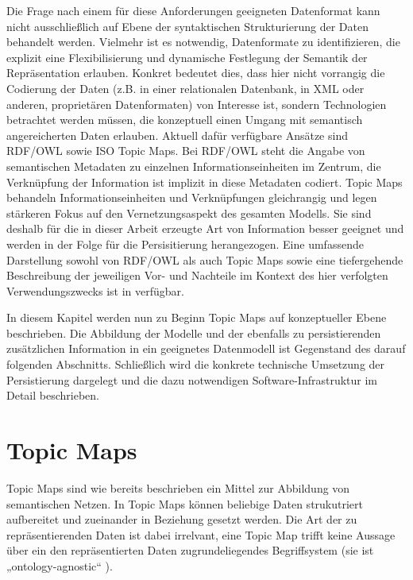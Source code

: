 Die Frage nach einem für diese Anforderungen geeigneten Datenformat kann nicht ausschließlich auf Ebene der syntaktischen Strukturierung der Daten behandelt werden. Vielmehr ist es notwendig, Datenformate zu identifizieren, die explizit eine Flexibilisierung und dynamische Festlegung der Semantik der Repräsentation erlauben. Konkret bedeutet dies, dass hier nicht vorrangig die Codierung der Daten (z.B. in einer relationalen Datenbank, in \gls{XML} oder anderen, proprietären Datenformaten) von Interesse ist, sondern Technologien betrachtet werden müssen, die konzeptuell einen Umgang mit semantisch angereicherten Daten erlauben. Aktuell dafür verfügbare Ansätze sind \gls{RDF}/\gls{OWL} sowie ISO Topic Maps. Bei \gls{RDF}/\gls{OWL} steht die Angabe von semantischen Metadaten zu einzelnen Informationseinheiten im Zentrum, die Verknüpfung der Information ist implizit in diese Metadaten codiert. Topic Maps behandeln Informationseinheiten und Verknüpfungen gleichrangig und legen stärkeren Fokus auf den Vernetzungsaspekt des gesamten Modells. Sie sind deshalb für die in dieser Arbeit erzeugte Art von Information besser geeignet und werden in der Folge für die Persisitierung herangezogen. Eine umfassende Darstellung sowohl von \gls{RDF}/\gls{OWL} als auch Topic Maps sowie eine tiefergehende Beschreibung der jeweiligen Vor- und Nachteile im Kontext des hier verfolgten Verwendungszwecks ist in \citep{Oppl07} verfügbar.

In diesem Kapitel werden nun zu Beginn Topic Maps auf konzeptueller Ebene beschrieben. Die Abbildung der Modelle und der ebenfalls zu persistierenden zusätzlichen Information in ein geeignetes Datenmodell ist Gegenstand des darauf folgenden Abschnitts. Schließlich wird die konkrete technische Umsetzung der Persistierung dargelegt und die dazu notwendigen Software-Infrastruktur im Detail beschrieben.
 
\section{Topic Maps} %
\label{sec:topic_maps}

Topic Maps \citep{TMDM08} sind wie bereits beschrieben ein Mittel zur Abbildung von semantischen Netzen. In Topic Maps können beliebige Daten strukutriert aufbereitet und zueinander in Beziehung gesetzt werden. Die Art der zu repräsentierenden Daten ist dabei irrelvant, eine Topic Map trifft keine Aussage über ein den repräsentierten Daten zugrundeliegendes Begriffsystem (sie ist „ontology-agnostic“ \citep{Vatant04}).

